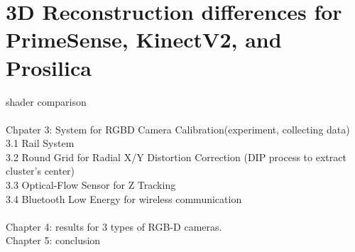 \section{3D Reconstruction differences for PrimeSense, KinectV2, and Prosilica}
shader comparison
%
%
%
%
%
%
%
\\\\Chpater 3: System for RGBD Camera Calibration(experiment, collecting data)\\
3.1 Rail System\\
3.2 Round Grid for Radial X/Y Distortion Correction (DIP process to extract cluster's center)\\
3.3 Optical-Flow Sensor for Z Tracking\\
3.4 Bluetooth Low Energy for wireless communication\\
\\Chapter 4: results for 3 types of RGB-D cameras.\\
Chapter 5: conclusion\\





































